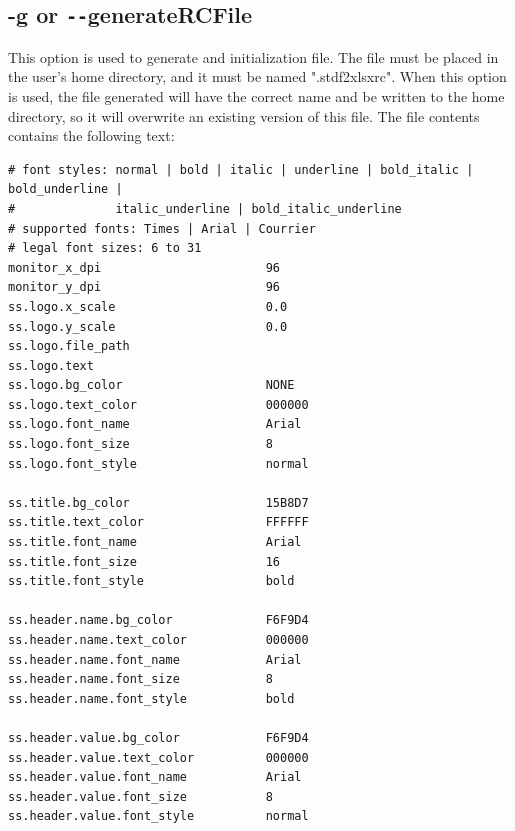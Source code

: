 \documentclass[letterpaper]{article}
\begin{document}
\subsection{\bf -g or \texttt{-{}-}generateRCFile}
This option is used to generate and initialization file.  The file
must be placed in the user's home directory, and it must be
named ".stdf2xlsxrc".  When this option is used, the file generated
will have the correct name and be written to the home directory, so
it will overwrite an existing version of this file. The file contents
contains the following text:
\begin{verbatim}
# font styles: normal | bold | italic | underline | bold_italic | bold_underline | 
#              italic_underline | bold_italic_underline
# supported fonts: Times | Arial | Courrier
# legal font sizes: 6 to 31
monitor_x_dpi                       96
monitor_y_dpi                       96
ss.logo.x_scale                     0.0
ss.logo.y_scale                     0.0
ss.logo.file_path           
ss.logo.text
ss.logo.bg_color                    NONE
ss.logo.text_color                  000000
ss.logo.font_name                   Arial
ss.logo.font_size                   8
ss.logo.font_style                  normal

ss.title.bg_color                   15B8D7
ss.title.text_color                 FFFFFF
ss.title.font_name                  Arial
ss.title.font_size                  16
ss.title.font_style                 bold

ss.header.name.bg_color             F6F9D4
ss.header.name.text_color           000000
ss.header.name.font_name            Arial
ss.header.name.font_size            8   
ss.header.name.font_style           bold

ss.header.value.bg_color            F6F9D4
ss.header.value.text_color          000000
ss.header.value.font_name           Arial
ss.header.value.font_size           8   
ss.header.value.font_style          normal
\end{verbatim}
\clearpage
\end{document}
